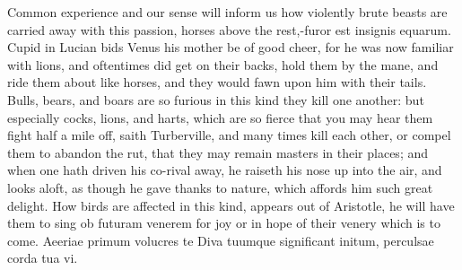 {Common experience and our sense will inform us how violently brute
beasts are carried away with this passion, horses above the rest,-furor
est insignis equarum. Cupid in Lucian bids Venus his mother be of
good cheer, for he was now familiar with lions, and oftentimes did get
on their backs, hold them by the mane, and ride them about like horses,
and they would fawn upon him with their tails. Bulls, bears, and boars
are so furious in this kind they kill one another: but especially
cocks,  lions, and harts, which are so fierce that you may hear
them fight half a mile off, saith Turberville, and many times
kill each other, or compel them to abandon the rut, that they may
remain masters in their places; and when one hath driven his co-rival
away, he raiseth his nose up into the air, and looks aloft, as though
he gave thanks to nature, which affords him such great delight. How
birds are affected in this kind, appears out of Aristotle, he will have
them to sing ob futuram venerem for joy or in hope of their venery
which is to come.
Aeeriae primum volucres te Diva tuumque
significant initum, perculsae corda tua vi.

}
